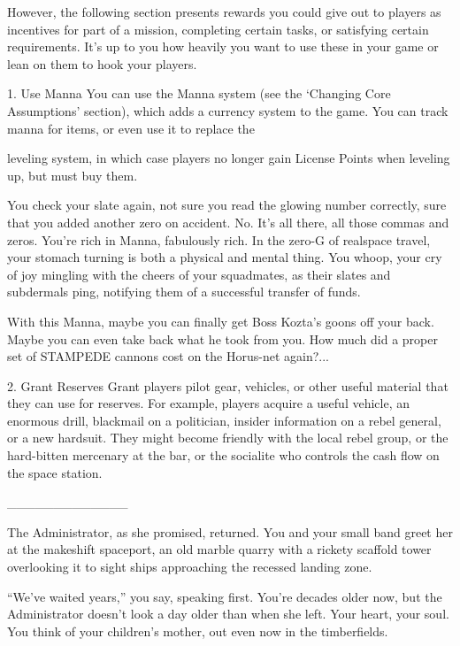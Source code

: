 However, the following section presents rewards you could give out to players as incentives for  
part of a mission, completing certain tasks, or satisfying certain requirements. It’s up to you how  
heavily you want to use these in your game or lean on them to hook your players.
 

1. Use Manna  
You can use the Manna system (see the ‘Changing Core Assumptions’ section), which adds a  
currency system to the game. You can track manna for items, or even use it to replace the  

                                                                                                          


leveling system, in which case players no longer gain License Points when leveling up, but must  
buy them.
 

You check your slate again, not sure you read the glowing number correctly, sure that you added  
another zero on accident. No. It’s all there, all those commas and zeros. You’re rich in Manna,  
fabulously rich. In the zero-G of realspace travel, your stomach turning is both a physical and  
mental thing. You whoop, your cry of joy mingling with the cheers of your squadmates, as their  
slates and subdermals ping, notifying them of a successful transfer of funds.   

With this Manna, maybe you can finally get Boss Kozta’s goons off your back. Maybe you can  
even take back what he took from you. How much did a proper set of STAMPEDE cannons cost  
on the Horus-net again?...   

2. Grant Reserves  
Grant players pilot gear, vehicles, or other useful material that they can use for reserves. For  
example, players acquire a useful vehicle, an enormous drill, blackmail on a politician, insider  
information on a rebel general, or a new hardsuit. They might become friendly with the local rebel  
group, or the hard-bitten mercenary at the bar, or the socialite who controls the cash flow on the  
space station.
 

\_\_\_\_\_\_\_\_\_\_\_\_\_
 

The Administrator, as she promised, returned. You and your small band greet her at the makeshift  
spaceport, an old marble quarry with a rickety scaffold tower overlooking it to sight ships  
approaching the recessed landing zone.   

“We’ve waited years,” you say, speaking first. You’re decades older now, but the Administrator  
doesn’t look a day older than when she left. Your heart, your soul. You think of your children’s  
mother, out even now in the timberfields.   

